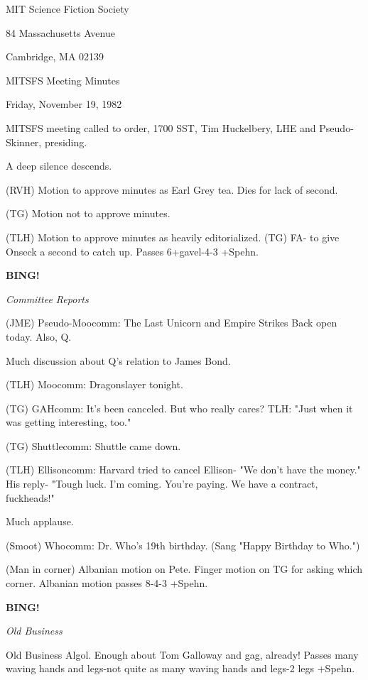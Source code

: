 \documentclass[12pt]{article}
\newcommand{\bing}{{\bf BING!} }
\newcommand{\goto}[1]{\bing \vskip 12pt \centerline{{\em{#1}}}}
\begin{document}
\begin{center}

MIT Science Fiction Society 

84 Massachusetts Avenue

Cambridge, MA 02139

\vspace{12pt}

MITSFS Meeting Minutes 

Friday, November 19, 1982

\end{center}
 
\vspace{18pt}

\setlength{\parskip}{6pt}

\noindent
MITSFS meeting called to order, 1700 SST,
Tim Huckelbery, LHE and Pseudo-Skinner, presiding.

A deep silence descends.

(RVH) Motion to approve minutes as Earl Grey tea. Dies for lack of second.

(TG) Motion not to approve minutes.

(TLH) Motion to approve minutes as heavily editorialized. (TG) FA- to give Onseck a second to catch up. Passes 6+gavel-4-3 +Spehn.

\goto{Committee Reports}

(JME) Pseudo-Moocomm: The Last Unicorn and Empire Strikes Back open today. Also, Q.

Much discussion about Q's relation to James Bond.

(TLH) Moocomm: Dragonslayer tonight.

(TG) GAHcomm: It's been canceled. But who really cares? TLH: "Just when it was getting interesting, too."

(TG) Shuttlecomm: Shuttle came down.

(TLH) Ellisoncomm: Harvard tried to cancel Ellison- "We don't have the money." His reply- "Tough luck. I'm coming. You're paying. We have a contract, fuckheads!"

Much applause.

(Smoot) Whocomm: Dr. Who's 19th birthday. (Sang "Happy Birthday to Who.")

(Man in corner) Albanian motion on Pete. Finger motion on TG for asking which corner. Albanian motion passes 8-4-3 +Spehn.

\goto{Old Business}

Old Business Algol. Enough about Tom Galloway and gag, already! Passes many waving hands and legs-not quite as many waving hands and legs-2 legs +Spehn.
\end{document}
